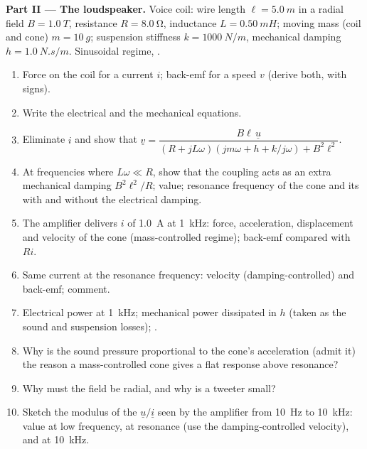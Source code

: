 \begin{problem}
\medskip
\noindent\textbf{Part II --- The loudspeaker.}
Voice coil: wire length $\ell = \qty{5.0}{m}$ in a radial field $B =
\qty{1.0}{T}$, resistance $R = \qty{8.0}{\ohm}$, inductance $L = \qty{0.50}{mH}$;
moving mass (coil and cone) $m = \qty{10}{g}$; suspension stiffness
$k = \qty{1000}{N/m}$, mechanical damping $h = \qty{1.0}{N.s/m}$. Sinusoidal
regime, .
\begin{enumerate}[resume]
  \item Force on the coil for a current $i$; back-emf for a speed $v$
        (derive both, with signs).
  \item Write the electrical and the mechanical equations.
  \item Eliminate $i$ and show that
        $\underline v = \dfrac{B\ell\,\underline u}{(R + jL\omega)(jm\omega + h + k/j\omega) + B^2\ell^2}$.
  \item At frequencies where $L\omega \ll R$, show that the coupling acts
        as an extra mechanical damping $B^2\ell^2/R$; value; resonance
        frequency of the cone and its  with and without
        the electrical damping.
  \item The amplifier delivers $i$ of  \qty{1.0}{A} at \qty{1}{kHz}:
        force, acceleration, displacement and velocity  of the
        cone (mass-controlled regime); back-emf  compared with
        $Ri$.
  \item Same current at the resonance frequency: velocity 
        (damping-controlled) and back-emf; comment.
  \item Electrical power at \qty{1}{kHz}; mechanical power dissipated in
        $h$ (taken as the sound and suspension losses); .
  \item Why is the sound pressure proportional to the cone's
        acceleration (admit it) the reason a mass-controlled cone gives a
        flat response above resonance?
  \item Why must the field be radial, and why is a tweeter small?
  \item Sketch the modulus of the  $\underline u/\underline i$ seen
        by the amplifier from \qty{10}{Hz} to \qty{10}{kHz}: value at low
        frequency, at resonance (use the damping-controlled velocity),
        and at \qty{10}{kHz}.
\end{enumerate}


\end{problem}
